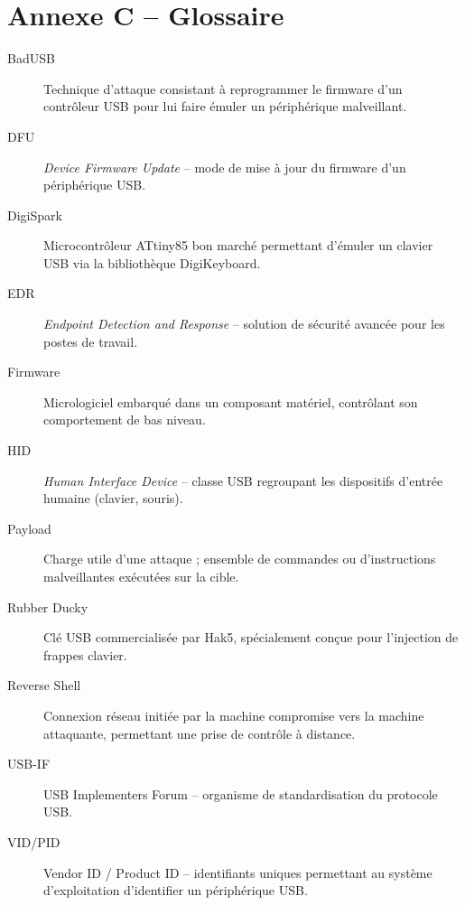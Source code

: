 \documentclass[12pt,a4paper]{report}
\begin{document}
\chapter{Annexe C -- Glossaire}

\begin{description}
  \item[BadUSB] Technique d'attaque consistant à reprogrammer le firmware d'un contrôleur USB pour lui faire émuler un périphérique malveillant.
  \item[DFU] \textit{Device Firmware Update} -- mode de mise à jour du firmware d'un périphérique USB.
  \item[DigiSpark] Microcontrôleur ATtiny85 bon marché permettant d'émuler un clavier USB via la bibliothèque DigiKeyboard.
  \item[EDR] \textit{Endpoint Detection and Response} -- solution de sécurité avancée pour les postes de travail.
  \item[Firmware] Micrologiciel embarqué dans un composant matériel, contrôlant son comportement de bas niveau.
  \item[HID] \textit{Human Interface Device} -- classe USB regroupant les dispositifs d'entrée humaine (clavier, souris).
  \item[Payload] Charge utile d'une attaque ; ensemble de commandes ou d'instructions malveillantes exécutées sur la cible.
  \item[Rubber Ducky] Clé USB commercialisée par Hak5, spécialement conçue pour l'injection de frappes clavier.
  \item[Reverse Shell] Connexion réseau initiée par la machine compromise vers la machine attaquante, permettant une prise de contrôle à distance.
  \item[USB-IF] USB Implementers Forum -- organisme de standardisation du protocole USB.
  \item[VID/PID] Vendor ID / Product ID -- identifiants uniques permettant au système d'exploitation d'identifier un périphérique USB.
\end{description}

\printbibliography[heading=bibintoc, title={Références bibliographiques}]
\end{document}
